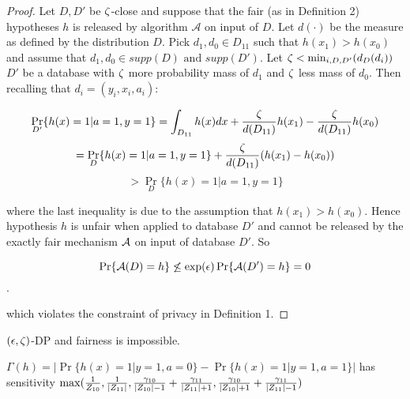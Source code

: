 \begin{proof}
	Let $D, D'$ be $\zeta$-close and suppose that the fair (as in
  Definition 2) hypotheses $h$ is released by algorithm $\mathcal{A}$
  on input of $D$. Let $d(\cdot)$ be the measure as defined by the
  distribution $D$. Pick $d_1, d_0 \in D_{11}$ such that $h(x_1) >
  h(x_0)$ and assume that $d_1, d_0 \in supp(D) \text{ and } supp(D')$.
  Let $\zeta < \min_{i,D,D'}(d_{D}(d_i))$ $D'$ be a database with $\zeta$
  more probability mass of $d_1$ and $\zeta$ less mass of $d_0$. Then
  recalling that $d_i = (y_i, x_i, a_i)$:

$$\Pr_{D'}\{h(x) = 1 | a = 1, y=1\} = \int_{D_{11}}h(x)dx +
\frac{\zeta}{d(D_{11})} h(x_1) - \frac{\zeta}{d(D_{11})} h(x_0) $$
$$= \Pr_{D}\{h(x) = 1 | a = 1, y=1\} + \frac{\zeta}{d(D_{11})} (h(x_1) - h(x_0))$$
$$>  \Pr_{D}\{h(x) = 1 | a = 1, y=1\}$$

where the last inequality is due to the assumption that $h(x_1) >
h(x_0)$. Hence hypothesis $h$ is unfair when applied to database $D'$
and cannot be released by the exactly fair mechanism $\mathcal{A}$ on input of
database $D'$. So

$$\Pr\{\mathcal{A}(D) = h\} \not\leq \exp(\epsilon)\Pr\{\mathcal{A}(D') = h\} = 0$$.

which violates the constraint of privacy in Definition 1.
\end{proof}

\begin{lemma}
  $(\epsilon, \zeta)$-DP and fairness is impossible. 
\end{lemma}




\begin{corollary} $\Gamma(h) = |\Pr\{h(x) = 1 | y=1, a =0\} - \Pr\{h(x) = 1 | y = 1, a = 1\}|$ has sensitivity $\max(\frac{1}{Z_{10}},\frac{1}{|Z_{11}|}, \frac{\gamma_{10}}{|Z_{10}|-1} + \frac{\gamma_{11}}{|Z_{11}|+1}, \frac{\gamma_{10}}{|Z_{10}|+1} + \frac{\gamma_{11}}{|Z_{11}|-1})$
\end{corollary}



